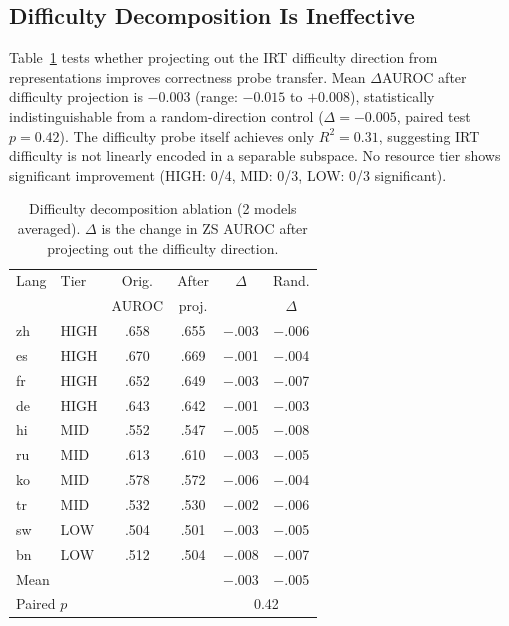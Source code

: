 \documentclass[11pt,a4paper]{article}
\newcommand{\auroc}{AUROC}
\begin{document}
\subsection{Difficulty Decomposition Is Ineffective}
\label{sec:decomposition}

Table~\ref{tab:decomposition} tests whether projecting out the IRT difficulty direction from representations improves correctness probe transfer.
Mean $\Delta$\auroc{} after difficulty projection is $-0.003$ (range: $-0.015$ to $+0.008$), statistically indistinguishable from a random-direction control ($\Delta = -0.005$, paired test $p = 0.42$).
The difficulty probe itself achieves only $R^2 = 0.31$, suggesting IRT difficulty is not linearly encoded in a separable subspace.
No resource tier shows significant improvement (HIGH: 0/4, MID: 0/3, LOW: 0/3 significant).

\begin{table}[t]
\centering
\small
\caption{Difficulty decomposition ablation (2 models averaged). $\Delta$ is the change in ZS \auroc{} after projecting out the difficulty direction.}
\label{tab:decomposition}
\begin{tabular}{llcccc}
\toprule
Lang & Tier & Orig. & After & $\Delta$ & Rand. \\
     &      & \auroc{} & proj. &       & $\Delta$ \\
\midrule
zh & HIGH & .658 & .655 & $-$.003 & $-$.006 \\
es & HIGH & .670 & .669 & $-$.001 & $-$.004 \\
fr & HIGH & .652 & .649 & $-$.003 & $-$.007 \\
de & HIGH & .643 & .642 & $-$.001 & $-$.003 \\
hi & MID  & .552 & .547 & $-$.005 & $-$.008 \\
ru & MID  & .613 & .610 & $-$.003 & $-$.005 \\
ko & MID  & .578 & .572 & $-$.006 & $-$.004 \\
tr & MID  & .532 & .530 & $-$.002 & $-$.006 \\
sw & LOW  & .504 & .501 & $-$.003 & $-$.005 \\
bn & LOW  & .512 & .504 & $-$.008 & $-$.007 \\
\midrule
\multicolumn{2}{l}{Mean} & & & $-$.003 & $-$.005 \\
\multicolumn{2}{l}{Paired $p$} & & & \multicolumn{2}{c}{0.42} \\
\bottomrule
\end{tabular}
\end{table}
\end{document}
